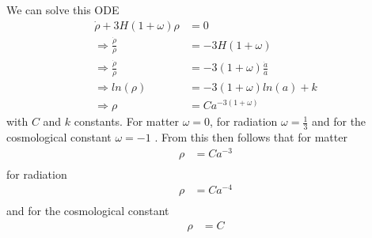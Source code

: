 \documentclass[a4paper, 11pt]{FSKH_623_Report}
\begin{document}
We can solve this ODE 
\begin{equation}
\begin{split}
\dot{\rho}+3H\left(1+\omega\right)\rho &= 0\\
\Rightarrow \frac{\dot{\rho}}{\rho} &= -3H\left(1+\omega\right)\\
\Rightarrow \frac{\dot{\rho}}{\rho} &= -3\left(1+\omega\right)\frac{\dot{a}}{a}\\
\Rightarrow ln(\rho) &= -3\left(1+\omega\right)ln(a) + k\\
\Rightarrow \rho &= Ca^{-3\left(1+\omega\right)}
\end{split}
\end{equation}
with $C$ and $k$ constants.
For matter $\omega=0$, for radiation $\omega=\frac{1}{3}$ and for the cosmological constant $\omega=-1$ \citep{notes4}. From this then follows that for matter 
\begin{equation}
\begin{split}
\rho &= Ca^{-3}\\
\end{split}
\end{equation}
for radiation
\begin{equation}
\begin{split}
\rho &= Ca^{-4}\\
\end{split}
\end{equation}
and for the cosmological constant
\begin{equation}
\begin{split}
\rho &= C\\
\end{split}
\end{equation}

















\citep{notes4}
                               
 
\pagebreak

%
\end{document}
